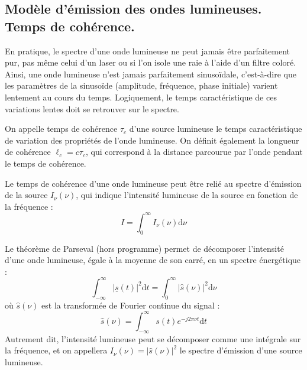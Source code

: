 \documentclass[11pt,fleqn]{book} %
\newcommand{\dd}{\mathrm{d}}
\begin{document}
\subsection{Modèle d'émission des ondes lumineuses. Temps de cohérence.}

En pratique, le spectre d’une onde lumineuse ne peut jamais être parfaitement pur, pas même celui d’un laser ou si l’on isole une raie à l’aide d’un filtre coloré. Ainsi, une onde lumineuse n’est jamais parfaitement sinusoïdale, c’est-à-dire que les paramètres de la sinusoïde (amplitude, fréquence, phase initiale) varient lentement au cours du temps. Logiquement, le temps caractéristique de ces variations lentes doit se retrouver sur le spectre.

\begin{definition}
	On appelle temps de cohérence $\tau_c$ d’une source lumineuse le temps caractéristique de variation des propriétés de l’onde lumineuse. On définit également la longueur de cohérence $\ell_c = c \tau_c$, qui correspond à la distance parcourue par l'onde pendant le temps de cohérence.
\end{definition}

Le temps de cohérence d'une onde lumineuse peut être relié au spectre d'émission de la source $I_\nu(\nu)$, qui indique l'intensité lumineuse de la source en fonction de la fréquence :
\begin{equation}
	I = \int_0^\infty I_\nu(\nu) \dd \nu
\end{equation}

\begin{remark}
	Le théorème de Parseval (hors programme) permet de décomposer l'intensité d'une onde lumineuse, égale à la moyenne de son carré, en un spectre énergétique :
	\begin{equation}
		\int_{-\infty}^\infty |\underline{s}(t)|^2 \dd t = \int_0^\infty |\hat{s}(\nu)|^2 \dd \nu
	\end{equation}
	où $\hat{s}(\nu)$ est la transformée de Fourier continue du signal :
	\begin{equation}
		\hat{s}(\nu) = \int_{-\infty}^\infty s(t) e^{-j 2 \pi \nu t} \dd t
	\end{equation}
	Autrement dit, l'intensité lumineuse peut se décomposer comme une intégrale sur la fréquence, et on appellera $I_\nu(\nu) = |\hat{s}(\nu)|^2$ le spectre d'émission d'une source lumineuse.
\end{remark}
\end{document}
